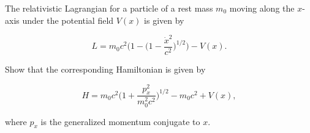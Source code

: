 \documentclass[../main.tex]{subfiles}
\begin{document}
\begin{problema}
	The relativistic Lagrangian for a particle of a rest mass \(m_{0}\)
	moving along the \(x\)-axis under the potential field \(V(x)\)
	is given by

	\begin{equation*}
		L = m_{0}c^{2} \Biggl(1 - \Biggl(1 - \dfrac{\dot{x}^{2}}{c^{2}}\Biggr)^{1/2}\Biggr) - V(x).
	\end{equation*}

	Show that the corresponding Hamiltonian is given by

	\begin{equation*}
		H = m_{0}c^{2} \Biggl(1 + \dfrac{p_{x}^{2}}{m_{0}^{2}c^{2}}\Biggr)^{1/2} - m_{0}c^{2} + V(x),
	\end{equation*}

	where \(p_{x}\) is the generalized momentum conjugate to \(x\).
\end{problema}
\end{document}
